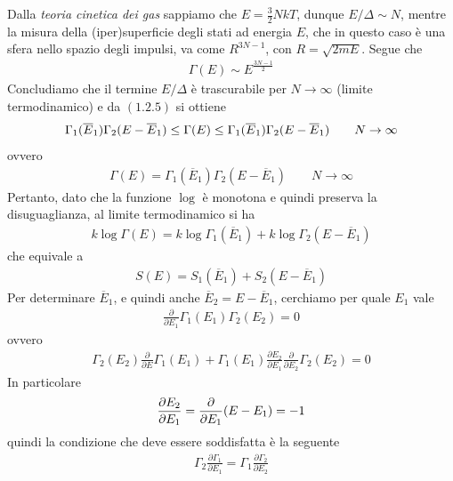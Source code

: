\documentclass{article}
\begin{document}
Dalla \textit{teoria cinetica dei gas} sappiamo che $E = \frac{3}{2}NkT$, dunque $E/\Delta \sim N$, mentre la misura della (iper)superficie degli stati ad energia $E$, che in questo caso è una sfera nello spazio degli impulsi, va come $R^{3N - 1}$, con $R = \sqrt{2mE}$. Segue che 
\begin{align*}
    \Gamma(E) \sim E^{\frac{3N - 1}{2}} 
\end{align*}
Concludiamo che il termine $E/\Delta$ è trascurabile per $N \rightarrow \infty$ (limite termodinamico) e da $(1.2.5)$ si ottiene
\begin{gather}
    \Gamma_1(\overline{E}_1)\Gamma_2(E - \overline{E}_1) \leq \Gamma(E) \leq \Gamma_1(\overline{E}_1)\Gamma_2(E - \overline{E}_1) \notag \qquad N \rightarrow \infty
\end{gather}
ovvero
\begin{gather}
    \Gamma(E) = \Gamma_1(\overline{E}_1)\Gamma_2(E - \overline{E}_1) \qquad N \rightarrow \infty \tag{1.2.6}
\end{gather}
Pertanto, dato che la funzione $\log$ è monotona e quindi preserva la disuguaglianza, al limite termodinamico si ha
\begin{gather}
    k\log\Gamma(E) = k\log\Gamma_1(\overline{E}_1) + k\log\Gamma_2(E - \overline{E}_1) \tag{1.2.7}
\end{gather}
che equivale a
\begin{gather}
    S(E) = S_1(\overline{E}_1) + S_2(E - \overline{E}_1) \tag{1.2.8}
\end{gather}
Per determinare $\overline{E}_1$, e quindi anche $\overline{E}_2 = E - \overline{E}_1$, cerchiamo per quale $E_1$ vale
\begin{gather}
    \frac{\partial}{\partial E_1}\Gamma_1(E_1)\Gamma_2(E_2) = 0 \tag{1.2.9}
\end{gather}
ovvero
\begin{align}
    \Gamma_2(E_2)\frac{\partial}{\partial E}\Gamma_1(E_1) + \Gamma_1(E_1)\frac{\partial E_2}{\partial E_1}\frac{\partial}{\partial E_2}\Gamma_2(E_2) = 0 \tag{1.2.10}
\end{align}
In particolare
\begin{gather}
    \frac{\partial E_2}{\partial E_1} = \frac{\partial}{\partial E_1}(E - E_1) = -1 \notag
\end{gather}
quindi la condizione che deve essere soddisfatta è la seguente
\begin{gather}
    \Gamma_2\frac{\partial\Gamma_1}{\partial E_1} = \Gamma_1\frac{\partial\Gamma_2}{\partial E_2} \tag{1.2.11}
\end{gather}
\end{document}
